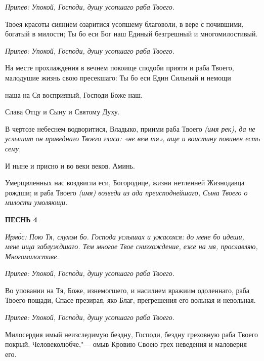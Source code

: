  \itshape Припев:\normalfont{} Упокой, Господи, душу усопшаго раба Твоего.



   Твоея красоты сиянием озаритися усопшему благоволи, в вере с
почившими, богатый в милости; Ты бо еси Бог наш Единый безгрешный и
многомилостивый.



 \itshape Припев:\normalfont{} Упокой, Господи, душу усопшаго раба Твоего.



   На месте прохлаждения в вечнем покоище сподоби прияти и раба Твоего,
малодушие жизнь свою пресекшаго: Ты бо еси Един Сильный и немощи

наша на Ся восприявый, Господи Боже наш.



   Слава Отцу и Сыну и Святому Духу.



   В чертозе небеснем водворитися, Владыко, приими раба Твоего \itshape  (имя
рек)\normalfont{}, да не услышит он праведнаго Твоего гласа: «не вем тя», аще и воистину
повинен есть сему.



   И ныне и присно и во веки веков. Аминь.



   Умерщвленных нас воздвигла еси, Богородице, жизни нетленней
Жизнодавца рождши; и раба Твоего \itshape  (имя)\normalfont{} возведи из ада преисподнейшаго,
Сына Твоего о милости умоляющи.



 

\bfseries ПЕСНЬ 4\normalfont{}


 \itshape Ирмо́с:\normalfont{} Пою Тя, слухом бо. Господа услышах и ужасохся: до мене бо идеши,
мене ища заблуждшаго. Тем многое Твое снизхождение, еже на мя, прославляю,
Многомилостиве.



 \itshape Припев:\normalfont{} Упокой, Господи, душу усопшаго раба Твоего.



   Во уповании на Тя, Боже, изнемогшего, и насилием вражиим одоленнаго,
раба Твоего пощади, Спасе презирая, яко Благ, прегрешения его вольная и
невольная.



 \itshape Припев:\normalfont{} Упокой, Господи, душу усопшаго раба Твоего.



   Милосердия имый неизследимую бездну, Господи, бездну греховную раба
Твоего покрый, Человеколюбче,"--- омыв Кровию Своею грех неведения и
маловерия его.



